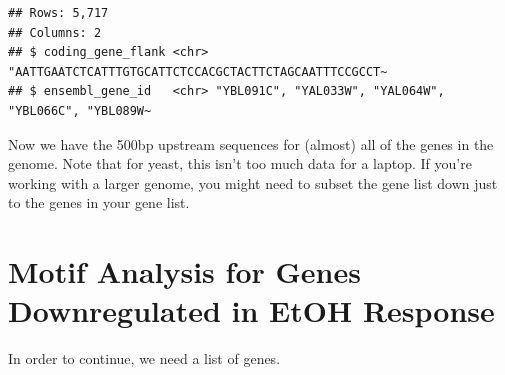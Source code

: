 \documentclass[
]{book}
\newenvironment{Shaded}{\begin{snugshade}}{\end{snugshade}}
\newcommand{\AttributeTok}[1]{\textcolor[rgb]{0.13,0.29,0.53}{#1}}
\newcommand{\CommentTok}[1]{\textcolor[rgb]{0.56,0.35,0.01}{\textit{#1}}}
\newcommand{\ConstantTok}[1]{\textcolor[rgb]{0.56,0.35,0.01}{#1}}
\newcommand{\DecValTok}[1]{\textcolor[rgb]{0.00,0.00,0.81}{#1}}
\newcommand{\FunctionTok}[1]{\textcolor[rgb]{0.13,0.29,0.53}{\textbf{#1}}}
\newcommand{\NormalTok}[1]{#1}
\newcommand{\OtherTok}[1]{\textcolor[rgb]{0.56,0.35,0.01}{#1}}
\newcommand{\SpecialCharTok}[1]{\textcolor[rgb]{0.81,0.36,0.00}{\textbf{#1}}}
\newcommand{\StringTok}[1]{\textcolor[rgb]{0.31,0.60,0.02}{#1}}
\begin{document}
\begin{Shaded}
\end{Shaded}

\begin{verbatim}
## Rows: 5,717
## Columns: 2
## $ coding_gene_flank <chr> "AATTGAATCTCATTTGTGCATTCTCCACGCTACTTCTAGCAATTTCCGCCT~
## $ ensembl_gene_id   <chr> "YBL091C", "YAL033W", "YAL064W", "YBL066C", "YBL089W~
\end{verbatim}

Now we have the 500bp upstream sequences for (almost) all of the genes
in the genome. Note that for yeast, this isn't too much data for a
laptop. If you're working with a larger genome, you might need to subset
the gene list down just to the genes in your gene list.

\hypertarget{motif-analysis-for-genes-downregulated-in-etoh-response}{%
\section{Motif Analysis for Genes Downregulated in EtOH Response}\label{motif-analysis-for-genes-downregulated-in-etoh-response}}

In order to continue, we need a list of genes.
\end{document}
